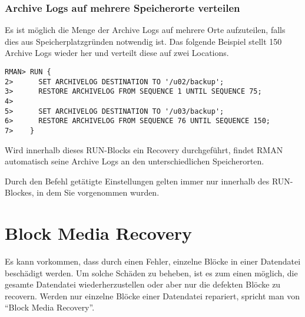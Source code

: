         \subsubsection{Archive Logs auf mehrere Speicherorte verteilen}
          Es ist möglich die Menge der Archive Logs auf mehrere Orte aufzuteilen, falls dies aus Speicherplatzgründen notwendig ist. Das folgende Beispiel stellt 150 Archive Logs wieder her und verteilt diese auf zwei Locations.
          \begin{lstlisting}[caption={Wiederherstellen der Archive Logs an verschiedenen Speicherorten},label=admin1491,language=rman]
RMAN> RUN {
2>      SET ARCHIVELOG DESTINATION TO '/u02/backup';
3>      RESTORE ARCHIVELOG FROM SEQUENCE 1 UNTIL SEQUENCE 75;
4>
5>      SET ARCHIVELOG DESTINATION TO '/u03/backup';
6>      RESTORE ARCHIVELOG FROM SEQUENCE 76 UNTIL SEQUENCE 150;
7>    }
          \end{lstlisting}
          Wird innerhalb dieses RUN-Blocks ein Recovery durchgeführt, findet RMAN automatisch seine Archive Logs an den unterschiedlichen Speicherorten.
          \begin{merke}
            Durch den Befehl  getätigte Einstellungen gelten immer nur innerhalb des RUN-Blockes, in dem Sie vorgenommen wurden.
          \end{merke}
    \section{Block Media Recovery}
      Es kann vorkommen, dass durch einen Fehler, einzelne Blöcke in einer Datendatei beschä\-digt werden. Um solche Schäden zu beheben, ist es zum einen möglich, die gesamte Datendatei wiederherzustellen oder aber nur die defekten Blöcke zu recovern. Werden nur einzelne Blöcke einer Datendatei repariert, spricht man von \enquote{Block Media Recovery}.

